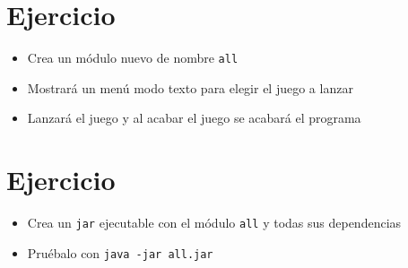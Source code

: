 \documentclass[a4paper]{article}
\begin{document}
\section{Ejercicio}
\label{sec:org0000045}
\begin{itemize}
\item Crea un módulo nuevo de nombre \texttt{all}
\item Mostrará un menú modo texto para elegir el juego a lanzar
\item Lanzará el juego y al acabar el juego se acabará el programa
\end{itemize}
\section{Ejercicio}
\label{sec:org0000048}
\begin{itemize}
\item Crea un \texttt{jar} ejecutable con el módulo \texttt{all} y todas sus dependencias
\item Pruébalo con \texttt{java -jar all.jar}
\end{itemize}
\end{document}
